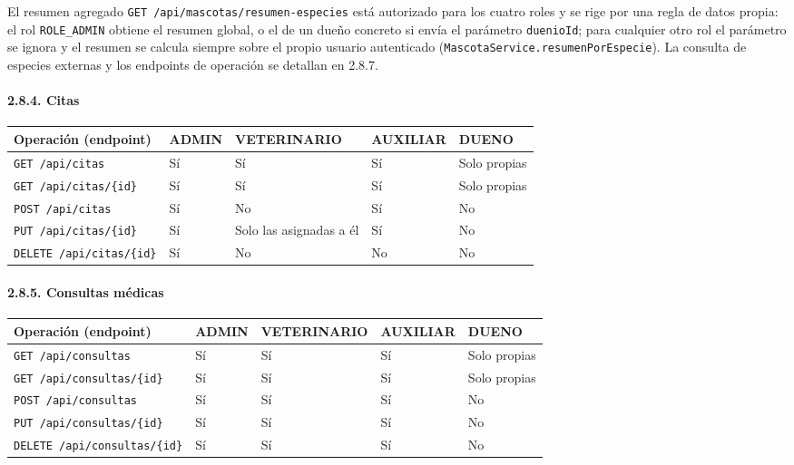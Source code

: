 \documentclass[
  spanish,
]{article}
\newcounter{none} %
\begin{document}
El resumen agregado \texttt{GET\ /\allowbreak{}api/\allowbreak{}mascotas/\allowbreak{}resumen-\allowbreak{}especies} está
autorizado para los cuatro roles y se rige por una regla de datos
propia: el rol \texttt{ROLE\_\allowbreak{}ADMIN} obtiene el resumen global, o el de
un dueño concreto si envía el parámetro \texttt{duenio\allowbreak{}Id}; para
cualquier otro rol el parámetro se ignora y el resumen se calcula
siempre sobre el propio usuario autenticado
(\texttt{Mascota\allowbreak{}Service.\allowbreak{}resumen\allowbreak{}Por\allowbreak{}Especie}). La consulta de especies
externas y los endpoints de operación se detallan en 2.8.7.

\paragraph{2.8.4. Citas}\label{citas}

{\def\LTcaptype{none} %
\begin{longtable}[]{@{}lllll@{}}
\toprule\noalign{}
Operación (endpoint) & ADMIN & VETERINARIO & AUXILIAR & DUENO \\
\midrule\noalign{}
\endhead
\bottomrule\noalign{}
\endlastfoot
\texttt{GET\ /\allowbreak{}api/\allowbreak{}citas} & Sí & Sí & Sí & Solo propias \\
\texttt{GET\ /\allowbreak{}api/\allowbreak{}citas/\allowbreak{}\{id\}} & Sí & Sí & Sí & Solo propias \\
\texttt{POST\ /\allowbreak{}api/\allowbreak{}citas} & Sí & No & Sí & No \\
\texttt{PUT\ /\allowbreak{}api/\allowbreak{}citas/\allowbreak{}\{id\}} & Sí & Solo las asignadas a él & Sí &
No \\
\texttt{DELETE\ /\allowbreak{}api/\allowbreak{}citas/\allowbreak{}\{id\}} & Sí & No & No & No \\
\end{longtable}
}

\paragraph{2.8.5. Consultas médicas}\label{consultas-muxe9dicas}

{\def\LTcaptype{none} %
\begin{longtable}[]{@{}lllll@{}}
\toprule\noalign{}
Operación (endpoint) & ADMIN & VETERINARIO & AUXILIAR & DUENO \\
\midrule\noalign{}
\endhead
\bottomrule\noalign{}
\endlastfoot
\texttt{GET\ /\allowbreak{}api/\allowbreak{}consultas} & Sí & Sí & Sí & Solo propias \\
\texttt{GET\ /\allowbreak{}api/\allowbreak{}consultas/\allowbreak{}\{id\}} & Sí & Sí & Sí & Solo propias \\
\texttt{POST\ /\allowbreak{}api/\allowbreak{}consultas} & Sí & Sí & Sí & No \\
\texttt{PUT\ /\allowbreak{}api/\allowbreak{}consultas/\allowbreak{}\{id\}} & Sí & Sí & Sí & No \\
\texttt{DELETE\ /\allowbreak{}api/\allowbreak{}consultas/\allowbreak{}\{id\}} & Sí & Sí & Sí & No \\
\end{longtable}
}
\end{document}
